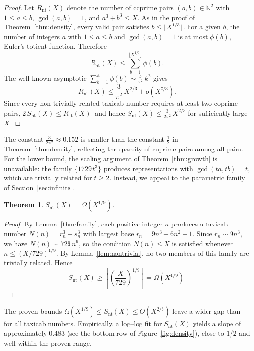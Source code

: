 \documentclass[12pt]{amsart}
\newtheorem{theorem}{Theorem}
\theoremstyle{definition}
\theoremstyle{remark}
\begin{document}
\begin{proof}
Let $R_{\mathrm{nt}}(X)$ denote the number of coprime pairs $(a,b) \in \mathbb{N}^2$ with $1 \le a \le b$, $\gcd(a,b) = 1$, and $a^3 + b^3 \le X$. As in the proof of Theorem~\ref{thm:density}, every valid pair satisfies $b \le \lfloor X^{1/3} \rfloor$. For a given $b$, the number of integers $a$ with $1 \le a \le b$ and $\gcd(a,b) = 1$ is at most $\phi(b)$, Euler's totient function. Therefore
\[
  R_{\mathrm{nt}}(X) \le \sum_{b=1}^{\lfloor X^{1/3} \rfloor} \phi(b).
\]
The well-known asymptotic $\sum_{b=1}^{k} \phi(b) \sim \frac{3}{\pi^2}\, k^2$ gives
\[
  R_{\mathrm{nt}}(X) \le \frac{3}{\pi^2}\, X^{2/3} + o(X^{2/3}).
\]
Since every non-trivially related taxicab number requires at least two coprime pairs, $2\,S_{\mathrm{nt}}(X) \le R_{\mathrm{nt}}(X)$, and hence $S_{\mathrm{nt}}(X) \le \frac{3}{2\pi^2}\, X^{2/3}$ for sufficiently large $X$.
\end{proof}

The constant $\frac{3}{2\pi^2} \approx 0.152$ is smaller than the constant $\frac{1}{2}$ in Theorem~\ref{thm:density}, reflecting the sparsity of coprime pairs among all pairs. For the lower bound, the scaling argument of Theorem~\ref{thm:growth} is unavailable: the family $\{1729\,t^3\}$ produces representations with $\gcd(ta,tb) = t$, which are trivially related for $t \ge 2$. Instead, we appeal to the parametric family of Section~\ref{sec:infinite}.

\begin{theorem}\label{thm:nt-lower}
  $S_{\mathrm{nt}}(X) = \Omega(X^{1/9})$.
\end{theorem}

\begin{proof}
By Lemma~\ref{thm:family}, each positive integer $n$ produces a taxicab number $N(n) = r_n^3 + s_n^3$ with largest base $r_n = 9n^3 + 6n^2 + 1$. Since $r_n \sim 9n^3$, we have $N(n) \sim 729\,n^9$, so the condition $N(n) \le X$ is satisfied whenever $n \le (X/729)^{1/9}$. By Lemma~\ref{lem:nontrivial}, no two members of this family are trivially related. Hence
\[
  S_{\mathrm{nt}}(X) \ge \left\lfloor \left(\frac{X}{729}\right)^{1/9} \right\rfloor = \Omega(X^{1/9}).
\]
\end{proof}

The proven bounds $\Omega(X^{1/9}) \le S_{\mathrm{nt}}(X) \le O(X^{2/3})$ leave a wider gap than for all taxicab numbers. Empirically, a log--log fit for $S_{\mathrm{nt}}(X)$ yields a slope of approximately $0.483$ (see the bottom row of Figure~\ref{fig:density}), close to $1/2$ and well within the proven range.
\end{document}
